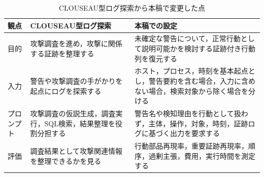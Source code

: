 \documentclass[a4paper,twocolumn,10pt]{article}
\begin{document}
\begin{table}[t]
\centering
\scriptsize
\caption{CLOUSEAU型ログ探索から本稿で変更した点}
\label{tab:clouseau_diff}
\setlength{\tabcolsep}{3pt}
\begin{tabular}{p{}p{}p{}}
\toprule
観点 & CLOUSEAU型ログ探索 & 本稿での設定 \\
\midrule
目的 & 攻撃調査を進め，攻撃に関係する証跡を整理する & 未確定な警告について，正常行動として説明可能かを検討する証跡付き行動列を復元する \\
入力 & 警告や攻撃調査の手がかりを起点にログを探索する & ホスト，プロセス，時刻を基本起点とし，警告要約を含む場合，入力に含めない場合，検索対象から除く場合を分ける \\
プロンプト & 攻撃調査の仮説生成，調査実行，SQL検索，結果整理を役割分担する & 警告名や検知理由を行動として扱わず，主体，操作，対象，時刻，証跡ログに基づく出力を要求する \\
評価 & 調査結果として攻撃関連情報を整理できるかを見る & 行動部品再現率，重要証跡再現率，順序，過剰主張，費用，実行時間を測定する \\
\bottomrule
\end{tabular}
\end{table}
\end{document}
